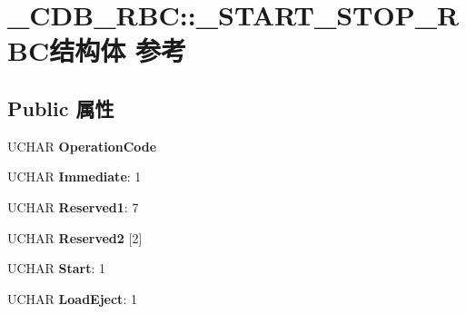 \hypertarget{struct___c_d_b___r_b_c_1_1___s_t_a_r_t___s_t_o_p___r_b_c}{}\section{\+\_\+\+C\+D\+B\+\_\+\+R\+BC\+:\+:\+\_\+\+S\+T\+A\+R\+T\+\_\+\+S\+T\+O\+P\+\_\+\+R\+B\+C结构体 参考}
\label{struct___c_d_b___r_b_c_1_1___s_t_a_r_t___s_t_o_p___r_b_c}
\subsection*{Public 属性}
\begin{DoxyCompactItemize}
\item 
\mbox{\label{struct___c_d_b___r_b_c_1_1___s_t_a_r_t___s_t_o_p___r_b_c_af6f02eff33a9ae82da25b1dd5b6b589b}} 
U\+C\+H\+AR {\bfseries Operation\+Code}
\item 
\mbox{\label{struct___c_d_b___r_b_c_1_1___s_t_a_r_t___s_t_o_p___r_b_c_aa09b49f38965a677ae16afd0894b3a8b}} 
U\+C\+H\+AR {\bfseries Immediate}\+: 1
\item 
\mbox{\label{struct___c_d_b___r_b_c_1_1___s_t_a_r_t___s_t_o_p___r_b_c_a0da7fda1d2514f35d13928a5b235af32}} 
U\+C\+H\+AR {\bfseries Reserved1}\+: 7
\item 
\mbox{\label{struct___c_d_b___r_b_c_1_1___s_t_a_r_t___s_t_o_p___r_b_c_aa7e4d9d2bfeac4fe01470680dca85add}} 
U\+C\+H\+AR {\bfseries Reserved2} \mbox{[}2\mbox{]}
\item 
\mbox{\label{struct___c_d_b___r_b_c_1_1___s_t_a_r_t___s_t_o_p___r_b_c_a2cc371dab06f78a20f61e63431fb8f4b}} 
U\+C\+H\+AR {\bfseries Start}\+: 1
\item 
\mbox{\label{struct___c_d_b___r_b_c_1_1___s_t_a_r_t___s_t_o_p___r_b_c_a84890f7b561e5f5442b34c1edaaa5d4b}} 
U\+C\+H\+AR {\bfseries Load\+Eject}\+: 1

\end{DoxyCompactItemize}
